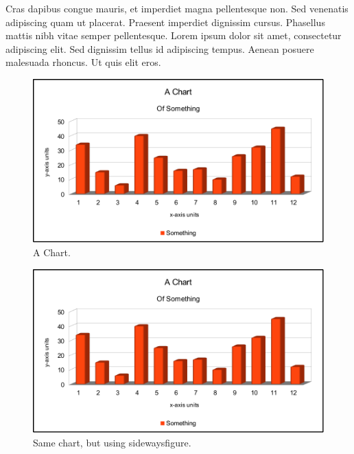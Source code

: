 \documentclass[double,12pt]{beavtex}
\begin{document}
Cras dapibus congue mauris, et imperdiet magna pellentesque non. Sed venenatis adipiscing quam ut placerat. Praesent imperdiet dignissim cursus. Phasellus mattis nibh vitae semper pellentesque. Lorem ipsum dolor sit amet, consectetur adipiscing elit. Sed dignissim tellus id adipiscing tempus. Aenean posuere malesuada rhoncus. Ut quis elit eros.


\pagebreak[4]

\begin{figure}
\begin{center}
	\includegraphics[width=14cm]{chart.pdf}
	\caption{A Chart.}
	\label{fig:chart}
	\end{center}
\end{figure}

\pagebreak[4]

\begin{figure}
\begin{center}
	\includegraphics[width=18cm]{chart.pdf}
	\caption{Same chart, but using sidewaysfigure.}
	\label{fig:rain}
	\end{center}
\end{figure}
\end{document}
